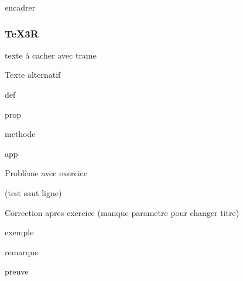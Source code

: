 \documentclass[fiche]{classe-tex3R}
\begin{document}
\begin{tcolorbox}
    encadrer
\end{tcolorbox}

\subsubsection{TeX3R}

\begin{visible}[true]
    texte à cacher avec trame                    
\end{visible}
\begin{visible}[false]
     Texte alternatif
\end{visible}


\begin{definition}
    def
\end{definition}

\begin{propriete}
    prop
\end{propriete}

\begin{methode}
    methode
\end{methode}

\begin{application}
    app
\end{application}

Problème avec exercice

\sautligne 
(test saut ligne)
\sautdeligne

\begin{correction}
    Correction apres exercice (manque parametre pour changer titre)
\end{correction}

\begin{exemple}
    exemple
\end{exemple}

\begin{remarque}
    remarque
\end{remarque}

\begin{preuve}
    preuve
\end{preuve}

\end{document}
